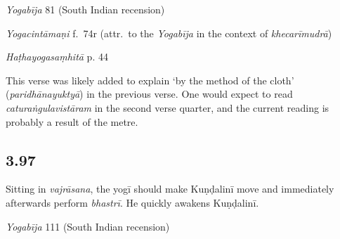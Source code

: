 \begin{ekdosis}
\begin{testimonia}[hp03_096_2]
\emph{Yogabīja} 81 (South Indian recension)
\begin{versinnote}
\end{versinnote}

\emph{Yogacintāmaṇi} f.~74r (attr.~to the \emph{Yogabīja} in the context of \emph{khecarīmudrā})
\begin{versinnote}
\end{versinnote}

\emph{Haṭhayogasaṃhitā} p. 44
\begin{versinnote}
\end{versinnote}
\end{testimonia}

\begin{philcomm}[hp03_096_2]
This verse was likely added to explain `by the method of the cloth' (\emph{paridhānayuktyā}) in the previous verse. One would expect to read \emph{caturaṅgulavistāram} in the second verse quarter, and the current reading is probably a result of the metre.
\end{philcomm}


\subsection*{3.97}
\begin{translation}[hp03_097]
Sitting in \emph{vajrāsana}, the yogī should make Kuṇḍalinī move and immediately afterwards perform \emph{bhastrī}. He quickly awakens Kuṇḍalinī.
\end{translation}


\begin{testimonia}[hp03_097]
\emph{Yogabīja} 111 (South Indian recension)
\begin{versinnote}
\end{versinnote}


\end{testimonia}
\end{ekdosis}
